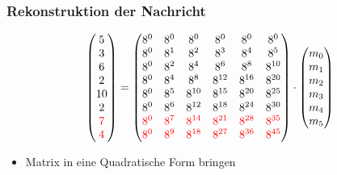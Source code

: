 \documentclass[11pt,aspectratio=169]{beamer}
\begin{document}
	\begin{frame}
		\frametitle{Rekonstruktion der Nachricht}
		
		\[
		\begin{pmatrix}
			5 \\ 3 \\ 6 \\ 2 \\ 10 \\ 2 \\ \textcolor{red}{7} \\ \textcolor{red}{4} \\
		\end{pmatrix}
		=
		\begin{pmatrix}
			8^0&    8^0&    8^0&    8^0&    8^0&    8^0\\
			8^0&	8^1&	8^2&	8^3&	8^4&	8^5\\
			8^0&	8^2&	8^4&	8^6&	8^8& 8^{10}\\
			8^0&	8^4&	8^8& 8^{12}& 8^{16}& 8^{20}\\
			8^0&	8^5& 8^{10}& 8^{15}& 8^{20}& 8^{25}\\
			8^0&	8^6& 8^{12}& 8^{18}& 8^{24}& 8^{30}\\
			\textcolor{red}{8^0}&	\textcolor{red}{8^7}& \textcolor{red}{8^{14}}& \textcolor{red}{8^{21}}& \textcolor{red}{8^{28}}& \textcolor{red}{8^{35}}\\
			\textcolor{red}{8^0}&	\textcolor{red}{8^9}& \textcolor{red}{8^{18}}& \textcolor{red}{8^{27}}& \textcolor{red}{8^{36}}& \textcolor{red}{8^{45}}\\
		\end{pmatrix}
		\cdot
		\begin{pmatrix}
			m_0 \\ m_1 \\ m_2 \\ m_3 \\ m_4 \\ m_5 \\
		\end{pmatrix}
		\]
		
		\vspace{5pt}
		
		\begin{itemize}
			\item Matrix in eine Quadratische Form bringen
		\end{itemize}
	
	\end{frame}
\end{document}
